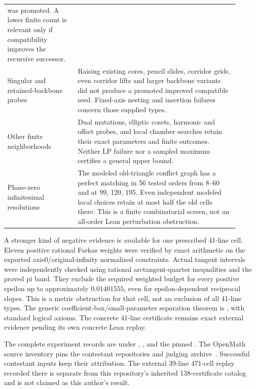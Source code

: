 \begin{longtable}{@{}P{0.29\linewidth}P{0.64\linewidth}@{}}
was promoted. A lower finite count is relevant only if compatibility
improves the recursive successor.\\
Singular and retained-backbone probes & Raising existing cores,
pencil slides, corridor grids, even corridor lifts and larger backbone
variants did not produce a promoted improved compatible seed. Fixed-axis
nesting and insertion failures concern those supplied types.\\
Other finite neighborhoods & Dual mutations, elliptic cosets, harmonic
and offset probes, and local chamber searches retain their exact
parameters and finite outcomes. Neither LP failure nor a sampled
maximum certifies a general upper bound.\\
Phase-zero infinitesimal resolutions & The modeled old-triangle
conflict graph has a perfect matching in 56 tested orders from 8--60
and at 99, 120, 195. Even independent modeled local choices retain at
most half the old cells there. This is a finite combinatorial screen,
not an all-order Lean perturbation obstruction.\\
\end{longtable}

A stronger kind of negative evidence is available for one prescribed
41-line cell. Eleven positive rational Farkas weights were verified by
exact arithmetic on the exported axis0/original-infinity normalized
constraints. Actual tangent intervals were independently checked using
rational arctangent-quarter inequalities and the proved pi band.
They exclude the required weighted budget for every positive epsilon
up to approximately $0.01401555$, even for epsilon-dependent reciprocal
slopes. This is a metric obstruction for that cell, not an exclusion of
all 41-line types. The generic coefficient-box/small-parameter separation
theorem is
,
with standard logical axioms. The concrete 41-line certificate remains
exact external evidence pending its own concrete Lean replay.

The complete experiment records are under
,
,
and the pinned .
The OpenMath source inventory pins the contestant repositories and judging
archive~\cite{poola2026,srirangam2026,openmathJudging2026}.
Successful contestant inputs keep their attribution. The external
39-line 471-cell replay recorded there is separate from this repository's
inherited 138-certificate catalog and is not claimed as this author's result.

